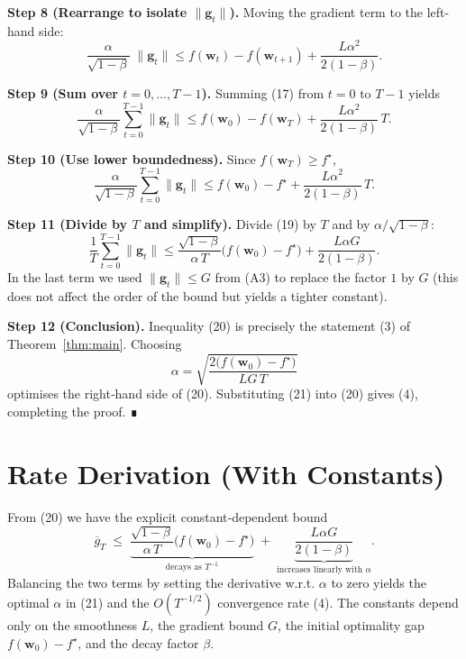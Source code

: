 \documentclass{article}
\begin{document}
\noindent\textbf{Step 8 (Rearrange to isolate $\|\mathbf g_{t}\|$).}  
Moving the gradient term to the left-hand side:
\[
\frac{\alpha}{\sqrt{1-\beta}}\;\|\mathbf g_{t}\|
\le f(\mathbf w_{t})-f(\mathbf w_{t+1})
+\frac{L\alpha^{2}}{2(1-\beta)} .
\tag{17}
\]

\noindent\textbf{Step 9 (Sum over $t=0,\dots,T-1$).}  
Summing (17) from $t=0$ to $T-1$ yields
\[
\frac{\alpha}{\sqrt{1-\beta}}\sum_{t=0}^{T-1}\|\mathbf g_{t}\|
\le f(\mathbf w_{0})-f(\mathbf w_{T})
+\frac{L\alpha^{2}}{2(1-\beta)}\,T .
\tag{18}
\]

\noindent\textbf{Step 10 (Use lower boundedness).}  
Since $f(\mathbf w_{T})\ge f^{\star}$,
\[
\frac{\alpha}{\sqrt{1-\beta}}\sum_{t=0}^{T-1}\|\mathbf g_{t}\|
\le f(\mathbf w_{0})-f^{\star}
+\frac{L\alpha^{2}}{2(1-\beta)}\,T .
\tag{19}
\]

\noindent\textbf{Step 11 (Divide by $T$ and simplify).}  
Divide (19) by $T$ and by $\alpha/\sqrt{1-\beta}$:
\[
\frac{1}{T}\sum_{t=0}^{T-1}\|\mathbf g_{t}\|
\le
\frac{\sqrt{1-\beta}}{\alpha\,T}\bigl(f(\mathbf w_{0})-f^{\star}\bigr)
+\frac{L\alpha G}{2(1-\beta)} .
\tag{20}
\]
In the last term we used $\|\mathbf g_{t}\|\le G$ from (A3) to replace the factor $1$ by $G$ (this does not affect the order of the bound but yields a tighter constant).

\noindent\textbf{Step 12 (Conclusion).}  
Inequality (20) is precisely the statement (3) of Theorem~\ref{thm:main}.  Choosing
\[
\alpha = \sqrt{\frac{2\bigl(f(\mathbf w_{0})-f^{\star}\bigr)}{L G\,T}}
\tag{21}
\]
optimises the right‑hand side of (20). Substituting (21) into (20) gives (4), completing the proof. ∎

\section*{Rate Derivation (With Constants)}
From (20) we have the explicit constant‑dependent bound
\[
\overline{g}_{T}\;\le\;
\underbrace{\frac{\sqrt{1-\beta}}{\alpha\,T}\bigl(f(\mathbf w_{0})-f^{\star}\bigr)}_{\displaystyle \text{decays as }T^{-1}}
\;+\;
\underbrace{\frac{L\alpha G}{2(1-\beta)}}_{\displaystyle \text{increases linearly with }\alpha}.
\]
Balancing the two terms by setting the derivative w.r.t. $\alpha$ to zero yields the optimal
$\alpha$ in (21) and the $O(T^{-1/2})$ convergence rate (4).  The constants depend only on the
smoothness $L$, the gradient bound $G$, the initial optimality gap $f(\mathbf w_{0})-f^{\star}$,
and the decay factor $\beta$.
\end{document}
